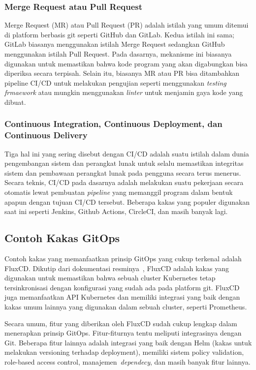 \subsubsection{Merge Request atau Pull Request}

Merge Request (MR) atau Pull Request (PR) adalah istilah yang umum ditemui di platform berbasis git seperti GitHub dan GitLab. Kedua istilah ini sama; GitLab biasanya menggunakan istilah Merge Request sedangkan GitHub menggunakan istilah Pull Request. Pada dasarnya, mekanisme ini biasanya digunakan untuk memastikan bahwa kode program yang akan digabungkan bisa diperiksa secara terpisah. Selain itu, biasanya MR atau PR bisa ditambahkan pipeline CI/CD untuk melakukan pengujian seperti menggunakan \textit{testing frmaework} atau mungkin menggunakan \textit{linter} untuk menjamin gaya kode yang dibuat. 

\subsubsection{Continuous Integration, Continuous Deployment, dan Continuous Delivery}

Tiga hal ini yang sering disebut dengan CI/CD adalah suatu istilah dalam dunia pengembangan sistem dan perangkat lunak untuk selalu memastikan integritas sistem dan pembawaan perangkat lunak pada pengguna secara terus menerus. Secara teknis, CI/CD pada dasarnya adalah melakukan suatu pekerjaan secara otomatis lewat pembuatan \textit{pipeline} yang memanggil program dalam bentuk apapun dengan tujuan CI/CD tersebut. Beberapa kakas yang populer digunakan saat ini seperti Jenkins, Github Actions, CircleCI, dan masih banyak lagi.

\subsection{Contoh Kakas GitOps}

Contoh kakas yang memanfaatkan prinsip GitOps yang cukup terkenal adalah FluxCD.
Dikutip dari dokumentasi resminya~\cite{fluxcd}, FluxCD adalah kakas yang digunakan untuk memastikan bahwa sebuah cluster Kubernetes tetap tersinkronisasi dengan konfigurasi yang sudah ada pada platform git.
FluxCD juga memanfaatkan API Kubernetes dan memiliki integrasi yang baik dengan kakas umum lainnya yang digunakan dalam sebuah cluster, seperti Prometheus.

Secara umum, fitur yang diberikan oleh FluxCD sudah cukup lengkap dalam menerapkan prinsip GitOps. Fitur-fiturnya tentu meliputi integrasinya dengan Git. Beberapa fitur lainnya adalah integrasi yang baik dengan Helm (kakas untuk melakukan versioning terhadap deployment), memiliki sistem policy validation, role-based access control, manajemen~\textit{dependecy}, dan masih banyak fitur lainnya.